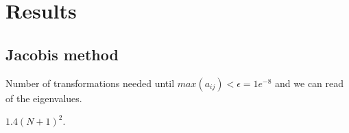 \section*{Results}

\subsection{Jacobis method}

Number of transformations needed until $max(a_{ij}) < \epsilon = 1e^{-8}$ and we
can read of the eigenvalues.

$1.4 (N+1)^2$.

